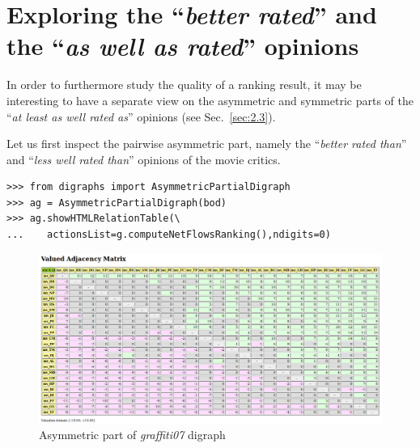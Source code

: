 \section{Exploring the ``\emph{better rated}''  and the ``\emph{as well as rated}'' opinions}
\label{sec:16.5}

In order to furthermore study the quality of a ranking result, it may be interesting to have a separate view on the asymmetric and symmetric parts of the ``\emph{at least as well rated as}'' opinions (see Sec.~\ref{sec:2.3}).

Let us first inspect the pairwise asymmetric part, namely the ``\emph{better rated than}'' and ``\emph{less well rated than}'' opinions of the movie critics. 
\begin{lstlisting}
>>> from digraphs import AsymmetricPartialDigraph
>>> ag = AsymmetricPartialDigraph(bod)
>>> ag.showHTMLRelationTable(\
...    actionsList=g.computeNetFlowsRanking(),ndigits=0)
\end{lstlisting}
\begin{figure}[ht]
\includegraphics[width=\hsize]{Figures/16-5-asymmetricPart.png}
\caption{Asymmetric part of \emph{graffiti07} digraph}
\label{fig:16.5}       %
\end{figure}


